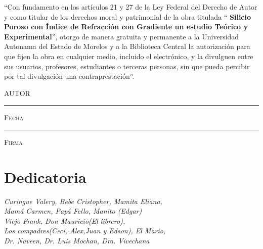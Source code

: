 \documentclass[a4paper,11pt,]{book}
\begin{document}

\thispagestyle{empty}
\vspace*{\fill}
\begingroup
``Con fundamento en los artículos 21 y 27 de la Ley Federal del Derecho de Autor y como titular de los derechos moral y patrimonial de la obra titulada ``\textbf{ Silicio Poroso con Índice de Refracción con Gradiente un estudio Teórico y Experimental}'', otorgo de manera gratuita y permanente a la Universidad Autonama del Estado de Morelos y a la Biblioteca Central la autorización para que fijen la obra en cualquier medio, incluido el electrónico, y la divulguen entre sus usuarios, profesores, estudiantes o terceras personas, sin que pueda percibir por tal divulgación una contraprestación''.

\centering

\hspace{3em}

\textsc{AUTOR}

\vspace{5em}

\rule[1em]{20em}{0.5pt} %

\textsc{Fecha}

\vspace{8em}

\rule[1em]{20em}{0.5pt} %

\textsc{Firma}

\endgroup
\vspace*{\fill}



\pagestyle{empty}
\frontmatter

 \chapter*{Dedicatoria}
\begin{flushright}
\textit{Curingue Valery, Bebe Cristopher, Mamita Eliana,\\ Mamá Carmen, Papá Fello, Manito (Edgar) \\ Viejo Frank, Don Mauricio(El librero),\\ Los compadres(Ceci, Alex,Juan y Edson), El Mario, \\ Dr. Naveen, Dr. Luis Mochan, Dra. Vivechana}

\end{flushright}
\end{document}
